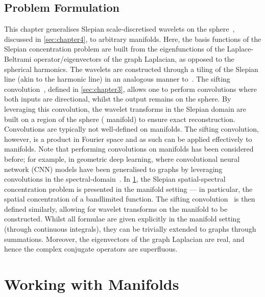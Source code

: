 



\subsection{Problem Formulation}\label{sec:chapter5_problem_formulation}

This chapter generalises Slepian scale-discretised wavelets on the sphere~\cite{Roddy2021a}, discussed in \cref{sec:chapter4}, to arbitrary manifolds.
Here, the basis functions of the Slepian concentration problem are built from the eigenfunctions of the Laplace-Beltrami operator/eigenvectors of the graph Laplacian, as opposed to the spherical harmonics.
The wavelets are constructed through a tiling of the Slepian line (akin to the harmonic line) in an analogous manner to~\cite{Wiaux2008,McEwen2018}.
The sifting convolution~\cite{Roddy2021}, defined in \cref{sec:chapter3}, allows one to perform convolutions where both inputs are directional, whilst the output remains on the sphere.
By leveraging this convolution, the wavelet transforms in the Slepian domain are built on a region of the sphere (\cf{} manifold) to ensure exact reconstruction.
Convolutions are typically not well-defined on manifolds.
The sifting convolution, however, is a product in Fourier space and as such can be applied effectively to manifolds.
Note that performing convolutions on manifolds has been considered before; for example, in geometric deep learning, where convolutional neural network (CNN) models have been generalised to graphs by leveraging convolutions in the spectral-domain~\cite{Bruna2014,Henaff2015,Defferrard2016}.
In \cref{sec:chapter5_working_with_manifolds}, the Slepian spatial-spectral concentration problem is presented in the manifold setting --- in particular, the spatial concentration of a bandlimited function.
The sifting convolution~\cite{Roddy2021} is then defined similarly, allowing for wavelet transforms on the manifold to be constructed.
Whilst all formulae are given explicitly in the manifold setting (through continuous integrals), they can be trivially extended to graphs through summations.
Moreover, the eigenvectors of the graph Laplacian are real, and hence the complex conjugate operators are superfluous.

\section{Working with Manifolds}\label{sec:chapter5_working_with_manifolds}

